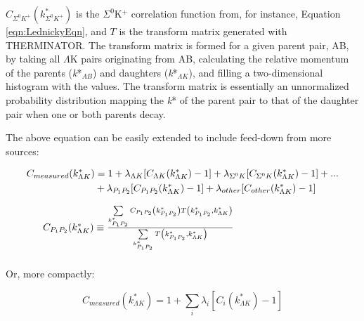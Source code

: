 \documentclass[ALICE,manyauthors]{cernphprep}
\begin{document}
$C_{\Sigma^{0}K^{+}}(k^{*}_{\Sigma^{0}K^{+}})$ is the $\Sigma^{0}$K$^{+}$ correlation function from, for instance, Equation \ref{eqn:LednickyEqn}, and $T$ is the transform matrix generated with THERMINATOR.  The transform matrix is formed for a given parent pair, AB, by taking all $\Lambda$K pairs originating from AB, calculating the relative momentum of the parents (\textit{k}*$_{AB}$) and daughters (\textit{k}*$_{\Lambda K}$), and filling a two-dimensional histogram with the values. The transform matrix is essentially an unnormalized probability distribution mapping the \textit{k}* of the parent pair to that of the daughter pair when one or both parents decay.

  The above equation can be easily extended to include feed-down from more sources:

\begin{equation}
\begin{array}{l}
\vspace{4mm}
\begin{split}
 C_{measured}(k^{*}_{\Lambda K}) & = 1 + \lambda_{\Lambda K}[C_{\Lambda K}(k^{*}_{\Lambda K})-1] + \lambda_{\Sigma^{0}K}[C_{\Sigma^{0}K}(k^{*}_{\Lambda K})-1] + ... \\ &
 + \lambda_{P_{1}P_{2}}[C_{P_{1}P_{2}}(k^{*}_{\Lambda K})-1] + \lambda_{other}[C_{other}(k^{*}_{\Lambda K})-1] 
\end{split}
\\
\vspace{2mm}
  ~~~~~C_{P_{1}P_{2}}(k^{*}_{\Lambda K}) \equiv \frac{\sum\limits_{k^{*}_{P_{1}P_{2}}} C_{P_{1}P_{2}}\left(k^{*}_{P_{1}P_{2}}\right) T\left(k^{*}_{P_{1}P_{2}},k^{*}_{\Lambda K}\right)}{\sum\limits_{k^{*}_{P_{1}P_{2}}} T\left(k^{*}_{P_{1}P_{2}},k^{*}_{\Lambda K}\right)}
\end{array} 
\label{eqn:ResidualsFull}
\end{equation}

  Or, more compactly:

\begin{equation}
 C_{measured}(k^{*}_{\Lambda K}) = 1 + \sum\limits_{i}  \lambda_{i}[C_{i}(k^{*}_{\Lambda K})-1]
\label{eqn:Residuals}
\end{equation}
\end{document}
